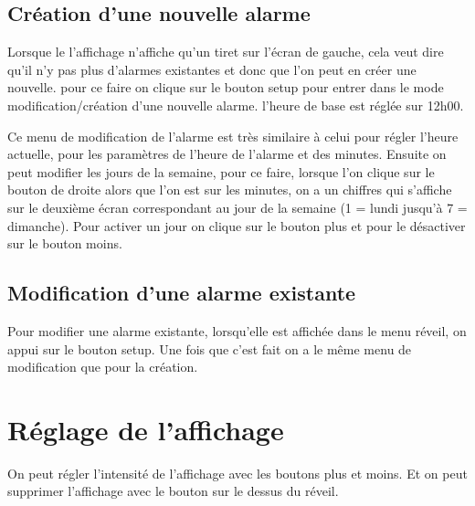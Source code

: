 \documentclass{article}
\begin{document}
\subsection{Création d'une nouvelle alarme}

Lorsque le l'affichage n'affiche qu'un tiret sur l'écran de gauche, cela veut dire qu'il n'y pas plus
d'alarmes existantes et donc que l'on peut en créer une nouvelle. pour ce faire on clique sur le bouton
setup pour entrer dans le mode modification/création d'une nouvelle alarme. l'heure de base est réglée sur 12h00.

Ce menu de modification de l'alarme est très similaire à celui pour régler l'heure actuelle, pour les paramètres
de l'heure de l'alarme et des minutes. Ensuite on peut modifier les jours de la semaine, pour ce faire,
lorsque l'on clique sur le bouton de droite alors que l'on est sur les minutes, on a un chiffres qui
s'affiche sur le deuxième écran correspondant au jour de la semaine (1 = lundi jusqu'à 7 = dimanche).
Pour activer un jour on clique sur le bouton plus et pour le désactiver sur le bouton moins.

\subsection{Modification d'une alarme existante}

Pour modifier une alarme existante, lorsqu'elle est affichée dans le menu réveil, on appui sur le bouton setup.
Une fois que c'est fait on a le même menu de modification que pour la création.

\section{Réglage de l'affichage}

On peut régler l'intensité de l'affichage avec les boutons plus et moins.
Et on peut supprimer l'affichage avec le bouton sur le dessus du réveil.
\end{document}
